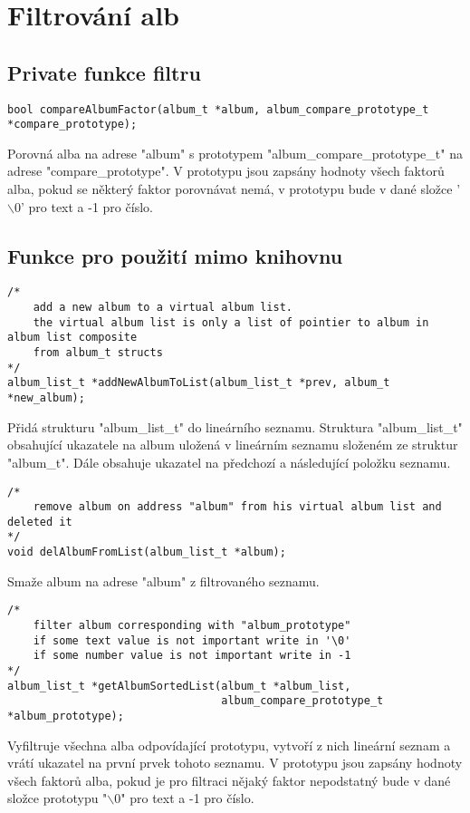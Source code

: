 \section{Filtrování alb}
\subsection{Private funkce filtru}
\begin{lstlisting}[style=CStyle]
    bool compareAlbumFactor(album_t *album, album_compare_prototype_t *compare_prototype);
\end{lstlisting}
Porovná alba na adrese "album" s prototypem "album\_compare\_prototype\_t" na adrese "compare\_prototype".
V prototypu jsou zapsány hodnoty všech faktorů alba, pokud se některý faktor porovnávat nemá, v prototypu bude v dané složce '$\backslash$0' pro text a -1 pro číslo.

\subsection{Funkce pro použití mimo knihovnu}
\begin{lstlisting}[style=CStyle]
/*
	add a new album to a virtual album list.
	the virtual album list is only a list of pointier to album in album list composite 
    from album_t structs
*/
album_list_t *addNewAlbumToList(album_list_t *prev, album_t *new_album);
\end{lstlisting}
Přidá strukturu "album\_list\_t" do lineárního seznamu.
Struktura "album\_list\_t" obsahující ukazatele na album uložená v lineárním seznamu složeném ze struktur "album\_t".
Dále obsahuje ukazatel na předchozí a následující položku seznamu.

\begin{lstlisting}[style=CStyle]
/*
    remove album on address "album" from his virtual album list and deleted it
*/
void delAlbumFromList(album_list_t *album);
\end{lstlisting}
Smaže album na adrese "album" z filtrovaného seznamu.

\begin{lstlisting}[style=CStyle]
/*
	filter album corresponding with "album_prototype"
	if some text value is not important write in '\0'
	if some number value is not important write in -1
*/
album_list_t *getAlbumSortedList(album_t *album_list, 
                                 album_compare_prototype_t *album_prototype);
\end{lstlisting}
Vyfiltruje všechna alba odpovídající prototypu, vytvoří z nich lineární seznam a vrátí ukazatel na první prvek tohoto seznamu.
V prototypu jsou zapsány hodnoty všech faktorů alba, pokud je pro filtraci nějaký faktor nepodstatný bude v dané složce prototypu "$\backslash$0" pro text a -1 pro číslo.

